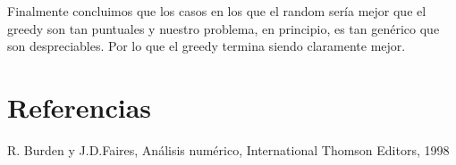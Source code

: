 Finalmente concluimos que los casos en los que el random sería mejor que el greedy son tan puntuales y nuestro problema, en principio, es tan genérico que son despreciables. Por lo que el greedy termina siendo claramente mejor.

\section{Referencias}

R. Burden y J.D.Faires, Análisis numérico, International Thomson Editors, 1998





